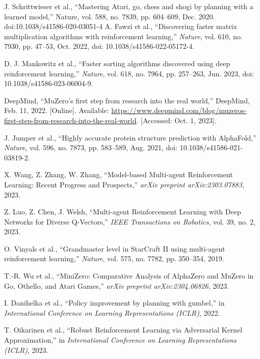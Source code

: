 \documentclass[conference]{IEEEtran}
\begin{document}
\begin{thebibliography}{00}
     J. Schrittwieser et al., “Mastering Atari, go, chess and shogi by planning with a learned model,” Nature, vol. 588, no. 7839, pp. 604–609, Dec. 2020. doi:10.1038/s41586-020-03051-4 
    A. Fawzi et al., ``Discovering faster matrix multiplication algorithms with reinforcement learning,'' \textit{Nature}, vol. 610, no. 7930, pp. 47--53, Oct. 2022, doi: 10.1038/s41586-022-05172-4.
    
    D. J. Mankowitz et al., ``Faster sorting algorithms discovered using deep reinforcement learning,'' \textit{Nature}, vol. 618, no. 7964, pp. 257–263, Jun. 2023, doi: 10.1038/s41586-023-06004-9.
    
    DeepMind, ``MuZero's first step from research into the real world,'' DeepMind, Feb. 11, 2022. [Online]. Available: \url{https://www.deepmind.com/blog/muzeros-first-step-from-research-into-the-real-world}. [Accessed: Oct. 1, 2023].
    
    J. Jumper et al., ``Highly accurate protein structure prediction with AlphaFold,'' \textit{Nature}, vol. 596, no. 7873, pp. 583–589, Aug. 2021, doi: 10.1038/s41586-021-03819-2.

    
     X. Wang, Z. Zhang, W. Zhang, ``Model-based Multi-agent Reinforcement Learning: Recent Progress and Prospects,'' \textit{arXiv preprint arXiv:2303.07883}, 2023.

     Z. Luo, Z. Chen, J. Welsh, ``Multi-agent Reinforcement Learning with Deep Networks for Diverse Q-Vectors,'' \textit{IEEE Transactions on Robotics}, vol. 39, no. 2, 2023.
    
     O. Vinyals et al., ``Grandmaster level in StarCraft II using multi-agent reinforcement learning,'' \textit{Nature}, vol. 575, no. 7782, pp. 350–354, 2019.
    
     T.-R. Wu et al., ``MiniZero: Comparative Analysis of AlphaZero and MuZero in Go, Othello, and Atari Games,'' \textit{arXiv preprint arXiv:2304.06826}, 2023.
    
     I. Danihelka et al., ``Policy improvement by planning with gumbel,'' in \textit{International Conference on Learning Representations (ICLR)}, 2022.
    
     T. Oikarinen et al., ``Robust Reinforcement Learning via Adversarial Kernel Approximation,'' in \textit{International Conference on Learning Representations (ICLR)}, 2023.


\end{thebibliography}
\vspace{12pt}
\end{document}
